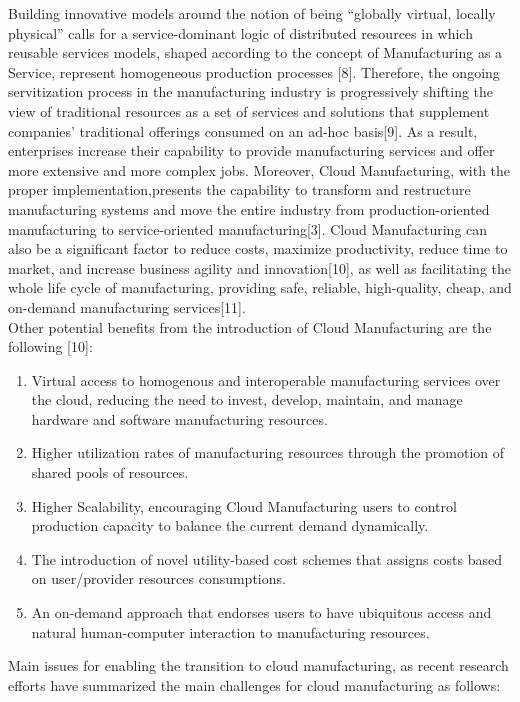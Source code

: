 Building innovative models around the notion of being “globally virtual, locally physical” calls for a service-dominant logic of distributed resources in which reusable services models, shaped according to the concept of Manufacturing as a Service, represent homogeneous production processes [8]. Therefore, the ongoing servitization process in the manufacturing industry is progressively shifting the view of traditional resources as a set of services and solutions that supplement companies’ traditional offerings consumed on an ad-hoc basis[9]. As a result, enterprises increase their capability to provide manufacturing services and offer more extensive and more complex jobs. Moreover, Cloud Manufacturing, with the proper implementation,presents the capability to transform and restructure manufacturing systems and move the entire industry from production-oriented manufacturing to service-oriented manufacturing[3]. Cloud Manufacturing can also be a significant factor to reduce costs, maximize productivity, reduce time to market, and increase business agility and innovation[10], as well as facilitating the whole life cycle of manufacturing, providing safe, reliable, high-quality, cheap, and on-demand manufacturing services[11].\\
Other potential benefits from the introduction of Cloud Manufacturing are the following [10]:
\begin{enumerate}
    \item Virtual access to homogenous and interoperable manufacturing services over the cloud, reducing the need to invest, develop, maintain, and manage hardware and software manufacturing resources.
    \item Higher utilization rates of manufacturing resources through the promotion of shared pools of resources.
    \item Higher Scalability, encouraging Cloud Manufacturing users to control production capacity to balance the current demand dynamically.
    \item The introduction of novel utility-based cost schemes that assigns costs based on user/provider resources consumptions.
    \item An on-demand approach that endorses users to have ubiquitous access and natural human-computer interaction to manufacturing resources.
\end{enumerate}
Main issues for enabling the transition to cloud manufacturing, as recent research efforts have summarized the main challenges for cloud manufacturing as follows:
